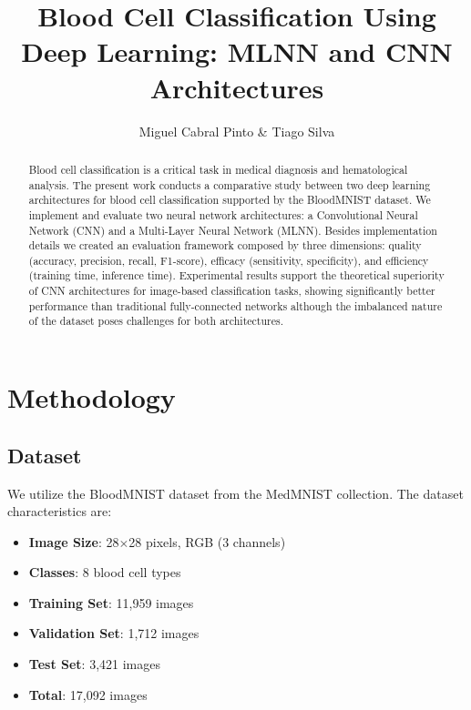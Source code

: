 \documentclass[runningheads]{llncs}
\begin{document}
\title{Blood Cell Classification Using Deep Learning: MLNN and CNN Architectures}
\author{Miguel Cabral Pinto \& Tiago Silva}


\maketitle

\begin{abstract}
Blood cell classification is a critical task in medical diagnosis and hematological analysis. 
The present work conducts a comparative study between two deep learning architectures for blood cell classification supported by the BloodMNIST dataset. 
We implement and evaluate two neural network architectures: a Convolutional Neural Network (CNN) and a Multi-Layer Neural Network (MLNN). 
Besides implementation details we created an evaluation framework composed by three dimensions: quality (accuracy, precision, recall, F1-score), efficacy (sensitivity, specificity), and efficiency (training time, inference time). 
Experimental results support the theoretical superiority of CNN architectures for image-based classification tasks, showing significantly better performance than traditional fully-connected networks although the imbalanced nature of the dataset poses challenges for both architectures.

\end{abstract}

\section{Methodology}

\subsection{Dataset}
We utilize the BloodMNIST dataset from the MedMNIST collection. The dataset characteristics are:

\begin{itemize}
    \item \textbf{Image Size}: 28$\times$28 pixels, RGB (3 channels)
    \item \textbf{Classes}: 8 blood cell types
    \item \textbf{Training Set}: 11,959 images
    \item \textbf{Validation Set}: 1,712 images
    \item \textbf{Test Set}: 3,421 images
    \item \textbf{Total}: 17,092 images
\end{itemize}
\end{document}
